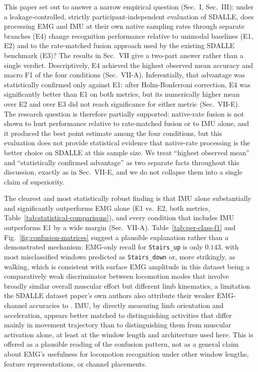 \documentclass[conference]{IEEEtran}
\begin{document}
This paper set out to answer a narrow empirical question (Sec.~I,
Sec.~III): under a leakage-controlled, strictly participant-independent
evaluation of SDALLE, does processing EMG and IMU at their own native
sampling rates through separate branches (E4) change recognition
performance relative to unimodal baselines (E1, E2) and to the
rate-matched fusion approach used by the existing SDALLE benchmark
(E3)? The results in Sec.~VII give a two-part answer rather than a
single verdict. Descriptively, E4 achieved the highest observed mean
accuracy and macro F1 of the four conditions (Sec.~VII-A).
Inferentially, that advantage was statistically confirmed only
against E1: after Holm-Bonferroni correction, E4 was significantly
better than E1 on both metrics, but its numerically higher mean over
E2 and over E3 did not reach significance for either metric
(Sec.~VII-E). The research question is therefore partially supported:
native-rate fusion is not shown to hurt performance relative to
rate-matched fusion or to IMU alone, and it produced the best point
estimate among the four conditions, but this evaluation does not
provide statistical evidence that native-rate processing is the
better choice on SDALLE at this sample size. We treat ``highest
observed mean'' and ``statistically confirmed advantage'' as two
separate facts throughout this discussion, exactly as in
Sec.~VII-E, and we do not collapse them into a single claim of
superiority.

The clearest and most statistically robust finding is that IMU alone
substantially and significantly outperforms EMG alone (E1 vs.\ E2,
both metrics, Table~\ref{tab:statistical-comparisons}), and every
condition that includes IMU outperforms E1 by a wide margin
(Sec.~VII-A). Table~\ref{tab:per-class-f1} and
Fig.~\ref{fig:confusion-matrices} suggest a plausible explanation
rather than a demonstrated mechanism: EMG-only recall for
\texttt{Stairs\_up} is only $0.143$, with most misclassified windows
predicted as \texttt{Stairs\_down} or, more strikingly, as walking,
which is consistent with surface EMG amplitude in this dataset being
a comparatively weak discriminator between locomotion modes that
involve broadly similar overall muscular effort but different limb
kinematics, a limitation the SDALLE dataset paper's own authors also
attribute their weaker EMG-channel accuracies to
\cite{el-khoreby2025sdalle}. IMU, by directly measuring limb
orientation and acceleration, appears better matched to distinguishing
activities that differ mainly in movement trajectory than to
distinguishing them from muscular activation alone, at least at the
window length and architecture used here. This is offered as a
plausible reading of the confusion pattern, not as a general claim
about EMG's usefulness for locomotion recognition under other window
lengths, feature representations, or channel placements.
\end{document}
